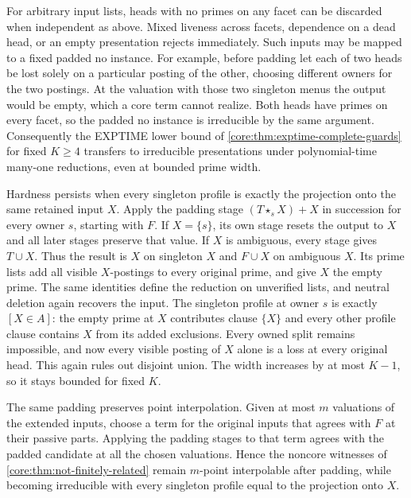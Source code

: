 For arbitrary input lists, heads with no primes on
any facet can be discarded when independent as above.
Mixed liveness across facets, dependence on a dead
head, or an empty presentation rejects immediately.
Such inputs may be mapped to a fixed padded no
instance. For example, before padding let each of
two heads be lost solely on a particular posting
of the other, choosing different owners for the
two postings. At the valuation with those two
singleton menus the output would be empty, which
a core term cannot realize. Both heads have primes
on every facet, so the padded no instance is
irreducible by the same argument. Consequently
the EXPTIME lower bound of
\cref{core:thm:exptime-complete-guards} for fixed
$K\ge4$ transfers to irreducible presentations
under polynomial-time many-one reductions, even
at bounded prime width.

Hardness persists when every singleton profile is
exactly the projection onto the same retained input
$X$. Apply the padding stage $(T\star_s X)+X$ in
succession for every owner $s$, starting with $F$.
If $X=\{s\}$, its own stage resets the output to
$X$ and all later stages preserve that value. If
$X$ is ambiguous, every stage gives $T\cup X$.
Thus the result is $X$ on singleton $X$ and
$F\cup X$ on ambiguous $X$. Its prime lists add
all visible $X$-postings to every original prime,
and give $X$ the empty prime. The same identities
define the reduction on unverified lists, and
neutral deletion again recovers the input. The
singleton profile at owner $s$ is exactly
$[X\in A]$: the empty prime at $X$ contributes
clause $\{X\}$ and every other profile clause
contains $X$ from its added exclusions. Every
owned split remains impossible, and now every
visible posting of $X$ alone is a loss at every
original head. This again rules out disjoint union.
The width increases by at most $K-1$, so it stays
bounded for fixed $K$.

The same padding preserves point interpolation.
Given at most $m$ valuations of the extended inputs,
choose a term for the original inputs that agrees
with $F$ at their passive parts. Applying the padding
stages to that term agrees with the padded candidate
at all the chosen valuations. Hence the noncore
witnesses of \cref{core:thm:not-finitely-related}
remain $m$-point interpolable after padding, while
becoming irreducible with every singleton profile
equal to the projection onto $X$.

